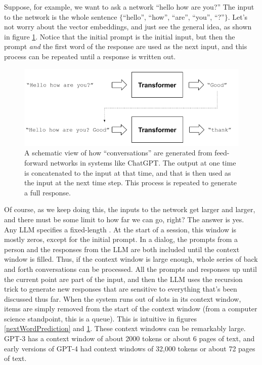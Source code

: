 Suppose, for example, we want to ask a network ``hello how are you?'' The input to the network is the whole sentence $\{$``hello'', ``how'', ``are'', ``you'', ``?''$\}$. Let's  not worry about the vector embeddings, and just see the general idea, as shown in figure \ref{gptRecursedInputs}. Notice that the initial prompt is the initial input, but then the prompt \emph{and} the first word of the response are used as the next input, and this process can be repeated until a response is written out.
  
\begin{figure}[h]
\centering
\includegraphics[scale=.7]{./images/gptRecursedInputs.png}
\caption[Jeff Yoshimi]{A schematic view of how ``conversations'' are generated from feed-forward networks in systems like ChatGPT. The output at one time is concatenated to the input at that time, and that is then used as the input at the next time step. This process is repeated to generate a full response.}
\label{gptRecursedInputs}
\end{figure}

Of course, as we keep doing this, the inputs to the network get larger and larger, and there must be some limit to how far we can go, right? The answer is yes. Any LLM specifies a fixed-length . At the start of a session, this window is mostly zeros, except for the initial prompt. In a dialog, the prompts from a person and the responses from the LLM are both included until the context window is filled. Thus, if the context window is large enough, whole series of back and forth conversations can be processed. All the prompts and responses up until the current point are part of the input, and then the LLM uses the recursion trick to generate new responses that are sensitive to everything that's been discussed thus far. When the system runs out of slots in its context window, items are simply removed from the start of the context window (from a computer science standpoint, this is a queue). This is intuitive in figures \ref{nextWordPrediction} and \ref{gptRecursedInputs}. These context windows can be remarkably large. GPT-3 has a context window of about 2000 tokens or about 6 pages of text, and early versions of GPT-4 had context windows of 32,000 tokens or about 72 pages of text. 

